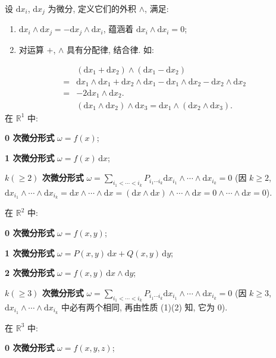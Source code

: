 \begin{definition}\label{def:11.3.1}
设 $\mathrm{d}x_{i}$, $\mathrm{d}x_{j}$ 为微分, 定义它们的外积 $\wedge$, 满足:
\begin{enumerate}
\item $\mathrm{d}x_{i}\wedge\mathrm{d}x_{j}=-\mathrm{d}x_{j}\wedge\mathrm{d}x_{i}$, 蕴涵着 $\mathrm{d}x_{i}\wedge\mathrm{d}x_{i}=0$;
\item 对运算 $+$, $\wedge$ 具有分配律, 结合律. 如:
\end{enumerate}
\[
\begin{aligned}
&(\mathrm{d}x_{1}+\mathrm{d}x_{2})\wedge(\mathrm{d}x_{1}-\mathrm{d}x_{2})\\
={}&\mathrm{d}x_{1}\wedge\mathrm{d}x_{1}+\mathrm{d}x_{2}\wedge\mathrm{d}x_{1}-\mathrm{d}x_{1}\wedge\mathrm{d}x_{2}-\mathrm{d}x_{2}\wedge\mathrm{d}x_{2}\\
={}&-2\mathrm{d}x_{1}\wedge\mathrm{d}x_{2}.\\
&(\mathrm{d}x_{1}\wedge\mathrm{d}x_{2})\wedge\mathrm{d}x_{3}=\mathrm{d}x_{1}\wedge(\mathrm{d}x_{2}\wedge\mathrm{d}x_{3}).
\end{aligned}
\]
在 $\mathbb{R}^{1}$ 中:

\textbf{0 次微分形式} $\omega=f(x)$;

\textbf{1 次微分形式} $\omega=f(x)\,\mathrm{d}x$;

\textbf{$k(\geqslant2)$ 次微分形式} $\omega=\sum_{i_{1}<\cdots<i_{k}}P_{i_{1}\cdots i_{k}}\mathrm{d}x_{i_{1}}\wedge\cdots\wedge\mathrm{d}x_{i_{k}}=0$ (因 $k\geqslant2$, $\mathrm{d}x_{i_{1}}\wedge\cdots\wedge\mathrm{d}x_{i_{k}}=\mathrm{d}x\wedge\cdots\wedge\mathrm{d}x=(\mathrm{d}x\wedge\mathrm{d}x)\wedge\cdots\wedge\mathrm{d}x=0\wedge\cdots\wedge\mathrm{d}x=0$).

在 $\mathbb{R}^{2}$ 中:

\textbf{0 次微分形式} $\omega=f(x,y)$;

\textbf{1 次微分形式} $\omega=P(x,y)\,\mathrm{d}x+Q(x,y)\,\mathrm{d}y$;

\textbf{2 次微分形式} $\omega=f(x,y)\,\mathrm{d}x\wedge\mathrm{d}y$;

\textbf{$k(\geqslant3)$ 次微分形式} $\omega=\sum_{i_{1}<\cdots<i_{k}}P_{i_{1}\cdots i_{k}}\mathrm{d}x_{i_{1}}\wedge\cdots\wedge\mathrm{d}x_{i_{k}}=0$ (因 $k\geqslant3$, $\mathrm{d}x_{i_{1}}\wedge\cdots\wedge\mathrm{d}x_{i_{k}}$ 中必有两个相同, 再由性质 (1)(2) 知, 它为 $0$).

在 $\mathbb{R}^{3}$ 中:

\textbf{0 次微分形式} $\omega=f(x,y,z)$;


\end{definition}
